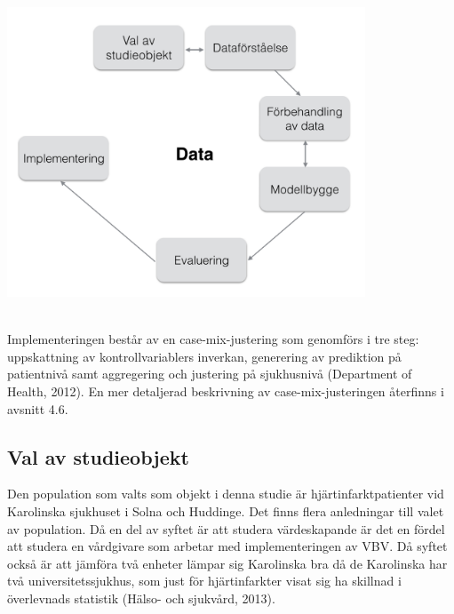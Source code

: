 \noindent\begin{minipage}{\textwidth}
\centering
\includegraphics[width=0.8\textwidth]{Data.png}
\label{fig:design}            
\end{minipage}
\\

Implementeringen består av en case-mix-justering som genomförs i tre steg: uppskattning av kontrollvariablers inverkan, generering av prediktion på patientnivå samt aggregering och justering på sjukhusnivå (Department of Health, 2012). En mer detaljerad beskrivning av case-mix-justeringen återfinns i avsnitt 4.6.

\subsection{Val av studieobjekt}

Den population som valts som objekt i denna studie är hjärtinfarktpatienter vid Karolinska sjukhuset i Solna och Huddinge. Det finns flera anledningar till valet av population. Då en del av syftet är att studera värdeskapande är det en fördel att studera en vårdgivare som arbetar med implementeringen av VBV. Då syftet också är att jämföra två enheter lämpar sig Karolinska bra då de Karolinska har två universitetssjukhus, som just för hjärtinfarkter visat sig ha skillnad i överlevnads statistik (Hälso- och sjukvård, 2013).

